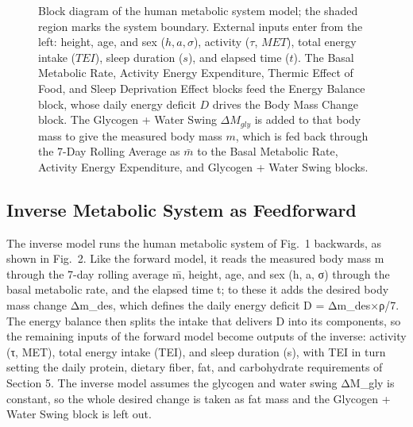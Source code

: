 \begin{figure}[htbp]
\begin{tikzpicture}
\end{tikzpicture}
\caption[Block diagram of the human metabolic system model.]{Block diagram of the human metabolic system model; the shaded region marks the system boundary. External inputs enter from the left: height, age, and sex ($h, a, \sigma$), activity ($\tau$, $MET$), total energy intake ($TEI$), sleep duration ($s$), and elapsed time ($t$). The Basal Metabolic Rate, Activity Energy Expenditure, Thermic Effect of Food, and Sleep Deprivation Effect blocks feed the Energy Balance block, whose daily energy deficit $D$ drives the Body Mass Change block. The Glycogen + Water Swing $\Delta M_{gly}$ is added to that body mass to give the measured body mass $m$, which is fed back through the 7-Day Rolling Average as $\bar{m}$ to the Basal Metabolic Rate, Activity Energy Expenditure, and Glycogen + Water Swing blocks.}
\label{fig_systemdiagram}
\end{figure}

\subsection{Inverse Metabolic System as Feedforward}

The inverse model runs the human metabolic system of Fig.~1 backwards, as shown in Fig.~2. Like the forward model, it reads the measured body mass m through the 7-day rolling average m̄, height, age, and sex (h, a, σ) through the basal metabolic rate, and the elapsed time t; to these it adds the desired body mass change Δm\_des, which defines the daily energy deficit D = Δm\_des×ρ/7. The energy balance then splits the intake that delivers D into its components, so the remaining inputs of the forward model become outputs of the inverse: activity (τ, MET), total energy intake (TEI), and sleep duration (s), with TEI in turn setting the daily protein, dietary fiber, fat, and carbohydrate requirements of Section 5. The inverse model assumes the glycogen and water swing ΔM\_gly is constant, so the whole desired change is taken as fat mass and the Glycogen + Water Swing block is left out.

